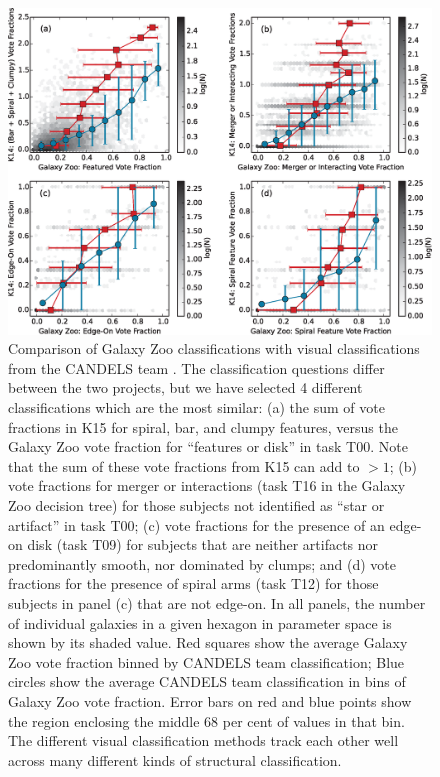 \documentclass[useAMS,usenatbib]{mn2e}
\begin{document}
{%
\begin{figure}
\includegraphics[scale=0.65]{gzteam_candelsteam_multiplot_compareboth.eps}
\caption{
Comparison of Galaxy Zoo classifications with visual classifications from the CANDELS team \citep[][K15]{kartaltepe15}. The classification questions differ between the two projects, but we have selected 4 different classifications which are the most similar: (a) the sum of vote fractions in K15 for spiral, bar, and clumpy features, versus the Galaxy Zoo vote fraction for ``features or disk'' in task T00. Note that the sum of these vote fractions from K15 can add to $> 1$; (b) vote fractions for merger or interactions (task T16 in the Galaxy Zoo decision tree) for those subjects not identified as ``star or artifact'' in task T00; (c) vote fractions for the presence of an edge-on disk (task T09) for subjects that are neither artifacts nor predominantly smooth, nor dominated by clumps; and (d) vote fractions for the presence of spiral arms (task T12) for those subjects in panel (c) that are not edge-on. In all panels, the number of individual galaxies in a given hexagon in parameter space is shown by its shaded value. Red squares show the average Galaxy Zoo vote fraction binned by CANDELS team classification; Blue circles show the average CANDELS team classification in bins of Galaxy Zoo vote fraction. Error bars on red and blue points show the region enclosing the middle 68 per cent of values in that bin. The different visual classification methods track each other well across many different kinds of structural classification.
}
\label{fig:candels_compare}
\end{figure}

}
\end{document}
